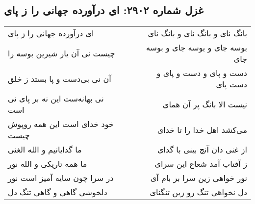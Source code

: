 \begin{center}
\section*{غزل شماره ۲۹۰۲: ای درآورده جهانی را ز پای}
\label{sec:2902}
\begin{longtable}{l p{0.5cm} r}
ای درآورده جهانی را ز پای
&&
بانگ نای و بانگ نای و بانگ نای
\\
چیست نی آن یار شیرین بوسه را
&&
بوسه جای و بوسه جای و بوسه جای
\\
آن نی بی‌دست و پا بستد ز خلق
&&
دست و پای و دست و پای و دست پای
\\
نی بهانه‌ست این نه بر پای نی است
&&
نیست الا بانگ پر آن همای
\\
خود خدای است این همه روپوش چیست
&&
می‌کشد اهل خدا را تا خدای
\\
ما گدایانیم و الله الغنی
&&
از غنی دان آنچ بینی با گدای
\\
ما همه تاریکی و الله نور
&&
ز آفتاب آمد شعاع این سرای
\\
در سرا چون سایه آمیز است نور
&&
نور خواهی زین سرا بر بام آی
\\
دلخوشی گاهی و گاهی تنگ دل
&&
دل نخواهی تنگ رو زین تنگنای
\\
\end{longtable}
\end{center}
